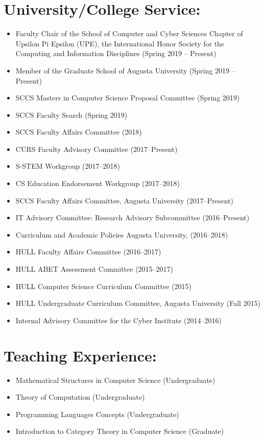 \documentclass[11pt]{article}
\begin{document}

\section{University/College Service:}
\label{sec:universitycollege_service:}
\begin{itemize}
\item Faculty Chair of the School of Computer and Cyber Sciences
  Chapter of Upsilon Pi Epsilon (UPE), the International Honor Society
  for the Computing and Information Disciplines (Spring 2019 --
  Present)
\item Member of the Graduate School of Augusta University (Spring 2019 -- Present)
\item SCCS Masters in Computer Science Proposal Committee (Spring 2019)
\item SCCS Faculty Search (Spring 2019)
\item SCCS Faculty Affairs Committee (2018)
\item CURS Faculty Advisory Committee (2017--Present)
\item S-STEM Workgroup (2017--2018)
\item CS Education Endorsement Workgroup (2017--2018)
\item SCCS Faculty Affairs Committee, Augusta University (2017--Present)
\item IT Advisory Committee: Research Advisory Subcommittee (2016--Present)
\item Curriculum and Academic Policies Augusta University, (2016--2018)
\item HULL Faculty Affairs Committee (2016--2017)
\item HULL ABET Assessment Committee (2015--2017)
\item HULL Computer Science Curriculum Committee (2015)
\item HULL Undergraduate Curriculum Committee, Augusta University (Fall 2015)
\item Internal Advisory Committee for the Cyber Institute (2014--2016)
\end{itemize}


\section{Teaching Experience:}
\label{sec:teaching_experience:}
\begin{itemize}
\item Mathematical Structures in Computer Science (Undergraduate)
\item Theory of Computation (Undergraduate)
\item Programming Languages Concepts (Undergraduate)  
\item Introduction to Category Theory in Computer Science (Graduate)
\end{itemize}
\end{document}
